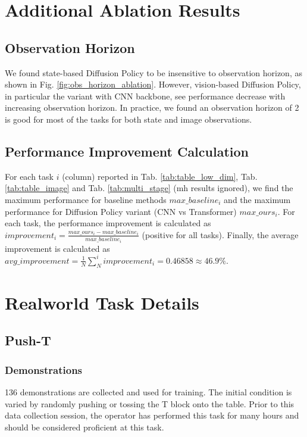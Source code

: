 \documentclass[Afour,sageh,times]{sagej}
\begin{document}
\section{Additional Ablation Results}
\subsection{Observation Horizon}
We found state-based Diffusion Policy to be insensitive to observation horizon, as shown in Fig. \ref{fig:obs_horizon_ablation}. However, vision-based Diffusion Policy, in particular the variant with CNN backbone, see performance decrease with increasing observation horizon. In practice, we found an observation horizon of 2 is good for most of the tasks for both state and image observations.

\subsection{Performance Improvement Calculation}
For each task $i$ (column) reported in Tab. \ref{tab:table_low_dim}, Tab. \ref{tab:table_image} and Tab. \ref{tab:multi_stage} (mh results ignored), we find the maximum performance for baseline methods $max\_baseline_i$ and the maximum performance for Diffusion Policy variant (CNN vs Transformer) $max\_ours_i$. For each task, the performance improvement is calculated as $improvement_i = \frac{max\_ours_i-max\_baseline_i}{max\_baseline_i}$ (positive for all tasks). Finally, the average improvement is calculated as $avg\_improvement=\frac{1}{N}\sum^i_N improvement_i=0.46858 \approx 46.9\%$.



\section{Realworld Task Details}

\subsection{Push-T}
\subsubsection{Demonstrations}
136 demonstrations are collected and used for training. The initial condition is varied by randomly pushing or tossing the T block onto the table. Prior to this data collection session, the operator has performed this task for many hours and should be considered proficient at this task.
\end{document}
